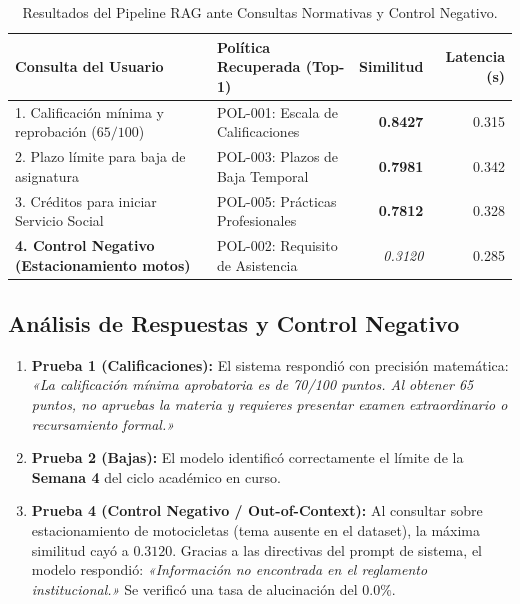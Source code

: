 \documentclass[12pt,letterpaper]{article}
\begin{document}
\begin{table}[h!]
\centering
\small
\caption{Resultados del Pipeline RAG ante Consultas Normativas y Control Negativo.}
\label{tab:rag_results}
\begin{tabularx}{\linewidth}{lXrr}
\toprule
\textbf{Consulta del Usuario} & \textbf{Política Recuperada (Top-1)} & \textbf{Similitud} & \textbf{Latencia (s)} \\
\midrule
1. Calificación mínima y reprobación ($65/100$) & POL-001: Escala de Calificaciones & \textbf{0.8427} & 0.315 \\
2. Plazo límite para baja de asignatura & POL-003: Plazos de Baja Temporal & \textbf{0.7981} & 0.342 \\
3. Créditos para iniciar Servicio Social & POL-005: Prácticas Profesionales & \textbf{0.7812} & 0.328 \\
\midrule
\textbf{4. Control Negativo (Estacionamiento motos)} & POL-002: Requisito de Asistencia & \textit{0.3120} & 0.285 \\
\bottomrule
\end{tabularx}
\end{table}

\subsection{Análisis de Respuestas y Control Negativo}
\begin{enumerate}
    \item \textbf{Prueba 1 (Calificaciones):} El sistema respondió con precisión matemática: \textit{«La calificación mínima aprobatoria es de 70/100 puntos. Al obtener 65 puntos, no apruebas la materia y requieres presentar examen extraordinario o recursamiento formal.»}
    \item \textbf{Prueba 2 (Bajas):} El modelo identificó correctamente el límite de la \textbf{Semana 4} del ciclo académico en curso.
    \item \textbf{Prueba 4 (Control Negativo / Out-of-Context):} Al consultar sobre estacionamiento de motocicletas (tema ausente en el dataset), la máxima similitud cayó a $0.3120$. Gracias a las directivas del prompt de sistema, el modelo respondió: \textit{«Información no encontrada en el reglamento institucional.»} Se verificó una tasa de alucinación del $\mathbf{0.0\%}$.
\end{enumerate}

\end{document}
